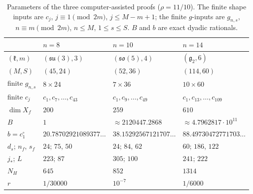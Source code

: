 \documentclass[11pt]{amsart}
\theoremstyle{definition}
\theoremstyle{remark}
\numberwithin{equation}{section}
\newcommand{\jst}{j_*}
\newcommand{\kf}{\mathfrak{k}}
\begin{document}
\begin{table}[ht]
\centering
\small
\begin{tabular}{@{}llll@{}}
\toprule
 & $n=8$ & $n=10$ & $n=14$\\
\midrule
$(\kf,m)$ & $(\mathfrak{su}(3),3)$ & $(\mathfrak{so}(5),4)$ & $(\mathfrak g_2,6)$\\
$(M,S)$ & $(45,24)$ & $(52,36)$ & $(114,60)$\\
finite $g_{n,s}$ & $8\times24$ & $7\times36$ & $10\times60$\\
finite $c_j$ & $c_1,c_7,\ldots,c_{43}$ & $c_1,c_9,\ldots,c_{49}$ & $c_1,c_{13},\ldots,c_{109}$\\
$\dim X_f$ & $200$ & $259$ & $610$\\
$B$ & $1$ & $\approx2120447.2868$ & $\approx4.7962817\cdot10^{11}$\\
$b=c^\circ_1$ & $20.78702921089377\ldots$ & $38.15292567121707\ldots$ & $88.49730472771703\ldots$\\
$d_s$; $n_f$, $s_f$ & $24$; $75$, $50$ & $24$; $84$, $62$ & $60$; $186$, $122$\\
$\jst$; $L$ & $223$; $87$ & $305$; $100$ & $241$; $222$\\
$N_H$ & $645$ & $852$ & $1314$\\
$r$ & $1/30000$ & $10^{-7}$ & $1/6000$\\
\bottomrule
\end{tabular}
\caption{Parameters of the three computer-assisted proofs ($\rho=11/10$). The finite shape inputs are $c_j$, $j\equiv1\pmod{2m}$, $j\leq M-m+1$; the finite $g$-inputs are $g_{n,s}$, $n\equiv m\pmod{2m}$, $n\leq M$, $1\leq s\leq S$. $B$ and $b$ are exact dyadic rationals.}
\label{lie:tab:param}
\end{table}
\end{document}
